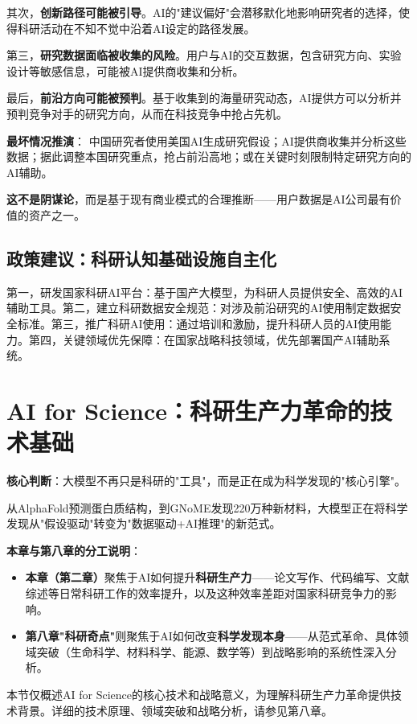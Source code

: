 其次，\textbf{创新路径可能被引导}。AI的"建议偏好"会潜移默化地影响研究者的选择，使得科研活动在不知不觉中沿着AI设定的路径发展。

第三，\textbf{研究数据面临被收集的风险}。用户与AI的交互数据，包含研究方向、实验设计等敏感信息，可能被AI提供商收集和分析。

最后，\textbf{前沿方向可能被预判}。基于收集到的海量研究动态，AI提供方可以分析并预判竞争对手的研究方向，从而在科技竞争中抢占先机。

\textbf{最坏情况推演}：
中国研究者使用美国AI生成研究假设；AI提供商收集并分析这些数据；据此调整本国研究重点，抢占前沿高地；或在关键时刻限制特定研究方向的AI辅助。

\textbf{这不是阴谋论}，而是基于现有商业模式的合理推断——用户数据是AI公司最有价值的资产之一。

\subsection{政策建议：科研认知基础设施自主化}
第一，研发国家科研AI平台：基于国产大模型，为科研人员提供安全、高效的AI辅助工具。第二，建立科研数据安全规范：对涉及前沿研究的AI使用制定数据安全标准。第三，推广科研AI使用：通过培训和激励，提升科研人员的AI使用能力。第四，关键领域优先保障：在国家战略科技领域，优先部署国产AI辅助系统。


\section{AI for Science：科研生产力革命的技术基础}

\textbf{核心判断}：大模型不再只是科研的"工具"，而是正在成为科学发现的"核心引擎"。

从AlphaFold预测蛋白质结构，到GNoME发现220万种新材料，大模型正在将科学发现从"假设驱动"转变为"数据驱动+AI推理"的新范式。

\textbf{本章与第八章的分工说明}：
\begin{itemize}
\item \textbf{本章（第二章）}聚焦于AI如何提升\textbf{科研生产力}——论文写作、代码编写、文献综述等日常科研工作的效率提升，以及这种效率差距对国家科研竞争力的影响。
\item \textbf{第八章"科研奇点"}则聚焦于AI如何改变\textbf{科学发现本身}——从范式革命、具体领域突破（生命科学、材料科学、能源、数学等）到战略影响的系统性深入分析。
\end{itemize}

本节仅概述AI for Science的核心技术和战略意义，为理解科研生产力革命提供技术背景。详细的技术原理、领域突破和战略分析，请参见第八章。

